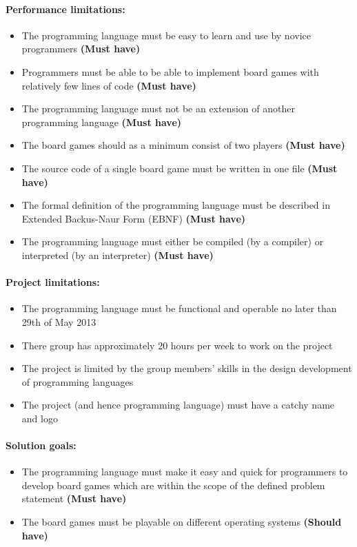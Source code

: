 \paragraph*{Performance limitations:}
\begin{itemize}[noitemsep]
  \item The programming language must be easy to learn and use by novice programmers \textbf{(Must have)}
  \item Programmers must be able to be able to implement board games with relatively few lines of code \textbf{(Must have)}
  \item The programming language must not be an extension of another programming language \textbf{(Must have)}
  \item The board games should as a minimum consist of two players \textbf{(Must have)}
  \item The source code of a single board game must be written in one file \textbf{(Must have)}
  \item The formal definition of the programming language must be described in Extended Backus-Naur Form (EBNF) \textbf{(Must have)}
  \item The programming language must either be compiled (by a compiler) or interpreted (by an interpreter) \textbf{(Must have)}
\end{itemize}

\paragraph*{Project limitations:}
\begin{itemize}[noitemsep]
  \item The programming language must be functional and operable no later than 29th of May 2013
  \item There group has approximately 20 hours per week to work on the project 
  \item The project is limited by the group members' skills in the design development of programming languages
  \item The project (and hence programming language) must have a catchy name and logo
\end{itemize}

\paragraph*{Solution goals:}
\begin{itemize}[noitemsep]
  \item The programming language must make it easy and quick for programmers to develop board games which are within the scope of the defined problem statement \textbf{(Must have)}
  \item The board games must be playable on different operating systems \textbf{(Should have)}
\end{itemize}



